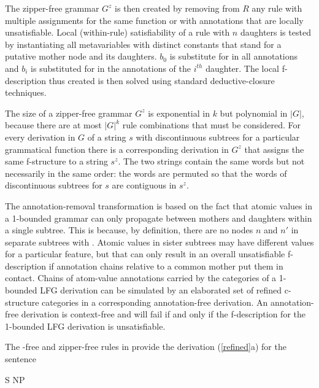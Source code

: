 \documentclass[output=paper,hidelinks]{langscibook}
\begin{document}
\noindent The zipper-free grammar $G^z$ is then created by removing from $R$ any rule with multiple assignments for the same function or with annotations that are locally unsatisfiable. Local (within-rule) satisfiability of a rule with $n$ daughters is tested by instantiating all metavariables with distinct constants  that stand for a putative mother node and its daughters.  $b_0$ is substitute for \up in all annotations and $b_i$ is substituted for \down in the annotations of the $i^{th}$ daughter.  The local f-description thus created is then solved using standard deductive-closure techniques.

The size of a zipper-free grammar $G^z$ is exponential in $k$ but polynomial in $|G|$, because there are at most $|G|^k$ rule combinations that must be considered. For every derivation in $G$ of a string $s$ with discontinuous subtrees for a particular grammatical function there is a corresponding derivation in $G^z$ that assigns the same f-structure to a string $s^z$.  The two strings contain the same words but not necessarily in the same order:  the words are permuted so that the words of discontinuous subtrees for $s$ are contiguous in $s^z$. 

\def\decor#1{\\[-.75ex]\footnotesize\avm{[#1]}\vspace{.5ex}}

The annotation-removal transformation  is based on the fact that atomic values in a 1-bounded grammar can only propagate between mothers and daughters within a single subtree. This is because, by definition, there are no nodes $n$ and $n'$ in separate subtrees with . Atomic values in sister subtrees may have different values for a particular feature, but that can only result in an overall unsatisfiable f-description if annotation chains relative to a common mother put them in contact.  Chains of atom-value annotations carried by the categories of a 1-bounded LFG derivation can be simulated by an elaborated set of refined c-structure categories in a corresponding annotation-free derivation.  An annotation-free derivation is context-free and will fail if and only if the f-description for the 1-bounded LFG derivation is unsatisfiable.

The \trivial-free and zipper-free rules in  provide the derivation (\ref{refined}a) for the sentence 

\ea\label{hewalks}\small
S \rarrow {}\hsp{-.5em} 
\hsp{3em}
NP \rarrow {}
\z
\end{document}
